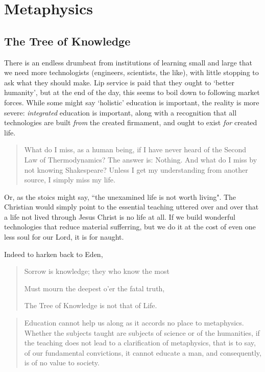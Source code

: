 \documentclass[letterpaper]{article}
\begin{document}
\section{Metaphysics}

\subsection{The Tree of Knowledge}

There is an endless drumbeat from institutions of learning small and large that we need more technologists (engineers, scientists, the like), with little stopping to ask what they should make. Lip service is paid that they ought to `better humanity', but at the end of the day, this seems to boil down to following market forces. While some might say `holistic' education is important, the reality is more severe: \textit{integrated} education is important, along with a recognition that all technologies are built \textit{from} the created firmament, and ought to exist \textit{for} created life.

\begin{quote}
What do I miss, as a human being, if I have never heard of the Second Law of Thermodynamics? The answer is: Nothing. And what do I miss by not knowing Shakespeare? Unless I get my understanding from another source, I simply miss my life.
\end{quote}

Or, as the stoics might say, ``the unexamined life is not worth living". The Christian would simply point to the essential teaching uttered over and over that a life not lived through Jesus Christ is no life at all. If we build wonderful technologies that reduce material sufferring, but we do it at the cost of even one less soul for our Lord, it is for naught.

Indeed to harken back to Eden,

\begin{quote}
  Sorrow is knowledge; they who know the most

  Must mourn the deepest o'er the fatal truth,

  The Tree of Knowledge is not that of Life.
\end{quote}

\begin{quote}
  Education cannot help us along as it accords no place to metaphysics. Whether the subjects taught are subjects of science or of the humanities, if the teaching does not lead to a clarification of metaphysics, that is to say, of our fundamental convictions, it cannot educate a man, and consequently, is of no value to society.
\end{quote}
\end{document}
